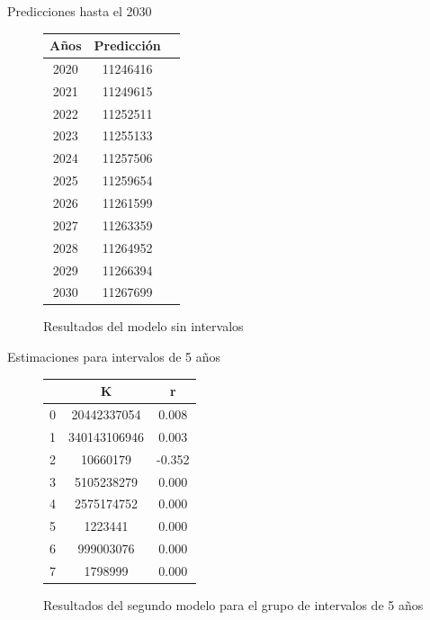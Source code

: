 \documentclass{beamer}
\begin{document}
\begin{frame}{Predicciones hasta el 2030}
    \begin{figure}[h!]%
		\begin{center}
			\begin{tabular}{|c|c|c|} \hline
            Años	& Predicción    \\ \hline
            2020 	& 11246416      \\ \hline
            2021 	& 11249615      \\ \hline
            2022 	& 11252511      \\ \hline
            2023 	& 11255133      \\ \hline
            2024 	& 11257506      \\ \hline
            2025 	& 11259654      \\ \hline
            2026 	& 11261599      \\ \hline
            2027 	& 11263359      \\ \hline
            2028 	& 11264952      \\ \hline
            2029 	& 11266394      \\ \hline
            2030 	& 11267699      \\ \hline
            \end{tabular}
        \caption{Resultados del modelo sin intervalos \label{fig:ex}}
    \end{center}
\end{figure}
\end{frame}
\begin{frame}{Estimaciones para intervalos de 5 años}
	\begin{figure}[h!]%
		\begin{center}
			\begin{tabular}{|c|c|c|} \hline
			 			& K 			& r 		\\ \hline
			0 			& 20442337054 	& 0.008  	\\ \hline
			1			& 340143106946 	& 0.003 	\\ \hline
			2			& 	  10660179	& -0.352 	\\ \hline
			3 			&   5105238279	&  0.000	\\ \hline
			4 			& 	2575174752	&  0.000 	\\ \hline
			5 			& 	   1223441	&  0.000	\\ \hline
			6 			& 	 999003076	&  0.000 	\\ \hline
			7 			& 	   1798999	&  0.000 	\\ \hline
			\end{tabular}
		\caption{Resultados del segundo modelo para el grupo de intervalos de 5 años \label{fig:ex}}
	\end{center}
\end{figure}
\end{frame} 
\end{document}

